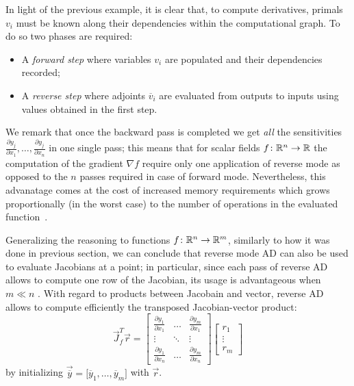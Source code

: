 \medskip
In light of the previous example, it is clear that, to compute derivatives, primals $v_i$ must be known along their dependencies within the computational graph. To do so two phases are required:
\begin{itemize}
	\item A \emph{forward step} where variables $v_i$ are populated and their dependencies recorded;
	\item A \emph{reverse step} where adjoints $\overline{v}_i$ are evaluated from outputs to inputs using values obtained in the first step.
\end{itemize}
We remark that once the backward pass is completed we get \emph{all} the sensitivities $\frac{\partial y_j}{\partial x_1}, \dots, \frac{\partial y_j}{\partial x_n}$ in one single pass; this means that for scalar fields $f \colon \mathbb{R}^n \to \mathbb{R}$ the computation of the gradient $\nabla f$ require only one application of reverse mode as opposed to the $n$ passes required in case of forward mode. Nevertheless, this advanatage comes at the cost of increased memory requirements which grows proportionally (in the worst case) to the number of operations in the evaluated function~\cite{Baydin:AD_survey}.

Generalizing the reasoning to functions $f \colon \mathbb{R}^n \to \mathbb{R}^m$, similarly to how it was done in previous section, we can conclude that reverse mode AD can also be used to evaluate Jacobians at a point; in particular, since each pass of reverse AD allows to compute one row of the Jacobian, its usage is advantageous when $m \ll n$ .
With regard to products between Jacobain and vector, reverse AD allows to compute efficiently the transposed Jacobian-vector product:
\[
\vec{J}_f^T \vec{r} = 
\begin{bmatrix}
	\frac{\partial y_1}{\partial x_1} &  \dots  & \frac{\partial y_m}{\partial x_1}  \\
	\vdots							  & \ddots  & \vdots							 \\
	\frac{\partial y_1}{\partial x_n} &  \dots  & \frac{\partial y_m}{\partial x_n}
\end{bmatrix}
\begin{bmatrix}
	r_1 	\\
	\vdots  \\
	r_m
\end{bmatrix}
\]
by initializing $\vec{\overline{y}}=\big[\overline{y}_1, \dots, \overline{y}_m \big]$ with $\vec{r}$.

